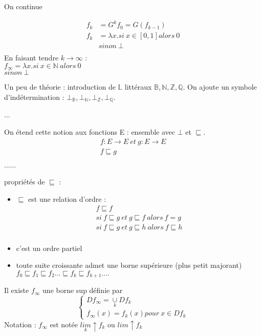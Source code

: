 \documentclass[11pt,a4paper]{article}
\begin{document}
	 On continue
	 
	 \begin{align*}
	 	f_{k} &= G^{k} f_{0} = G(f_{k-1})\\
	 	f_{k} &= \lambda x . si\ x \in [0,1] alors\ 0\\
	 	&sinon\ \bot\\
	 \end{align*}
	 En faisant tendre $k \to \infty$ :\\
	 $f_{\infty} = \lambda x . si\ x \in \mathbb{N}\ alors\ 0$\\
	 $sinon\ \bot$
	 
	 Un peu de théorie : introduction de $\mathbb{L}$ littéraux $\mathbb{B}, \mathbb{N}, \mathbb{Z}, \mathbb{Q}$. On ajoute un symbole d'indétermination : $\bot_{\mathbb{B}}, \bot_{\mathbb{N}}, \bot_{\mathbb{Z}}, \bot_{\mathbb{Q}}$.
	 
	 ...
	 
	 
	 
	 On étend cette notion aux fonctions E : ensemble avec $\bot$ et $\sqsubseteq$.\\
	 \begin{align*}
		 f : E \to E\ et\ g : E \to E\\
		 f \sqsubseteq g\\
	 \end{align*}
	 ......
	 
	 propriétés de $\sqsubseteq$ :
	 \begin{itemize}
	 	\item $\sqsubseteq$ est une relation d'ordre :
	 	\begin{align*}
	 		f \sqsubseteq f\\
	 		si\ f \sqsubseteq g\ et\ g \sqsubseteq f\ alors\ f = g\\
	 		si\ f \sqsubseteq g\ et\ g \sqsubseteq h\ alors\ f \sqsubseteq h\\
	 	\end{align*}
	 	\item c'est un ordre partiel
	 	\item toute suite croissante admet une borne supérieure (plus petit majorant)\\
	 	$f_{0} \sqsubseteq f_{1} \sqsubseteq f_{2} ... \sqsubseteq f_{k} \sqsubseteq f_{k+1} ....$
	 \end{itemize}
 	Il existe $f_{\infty}$ une borne sup définie par
 	$$\begin{cases}
	 	Df_{\infty} = \underset{k}{\cup} Df_{k}\\
	 	f_{\infty}(x) = f_{k}(x) pour\ x \in Df_{k}
 	\end{cases}$$
 	Notation : $f_{\infty}$ est notée $\underset{k}{lim}\uparrow f_{k}$ ou $lim\uparrow f_{k}$
 	
\end{document}
